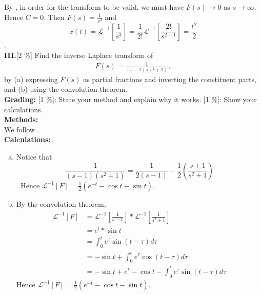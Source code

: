 \documentclass[A4paper,12pt]{article}
\theoremstyle{definition}
\numberwithin{equation}{section}
\begin{document}
By \cite{textbook}, in order for the transform to be valid, we must have $F(s) \rightarrow 0$ as $s \rightarrow \infty$. Hence $C= 0$.
Then $F(s) = \frac{1}{s^3}$ and
$$
x(t) = \mathcal{L}^{-1}[\frac{1}{s^3}] = \frac{1}{2!} \mathcal{L}^{-1}[\frac{2!}{s^{2+1}}] = \frac{t^2}{2}
$$.
\\
\textbf{III.}[2 \%]
Find the inverse Laplace transform of
\begin{align*}
F(s)=\frac{1}{(s-1)(s^2+1)},
\end{align*}
by (a) expressing \(F(s)\) as partial fractions and inverting the
constituent parts, and (b) using the convolution theorem.\\
\textbf{Grading:}
[1 \%]: State your method and explain why it works.
[1 \%]: Show your calculations.\\
\textbf{Methods: }\\
We follow \cite{textbook}.
\\
\textbf{Calculations: }\\
\begin{enumerate}[(a)]
    \item
        Notice that $$\frac{1}{(s-1)(s^2+1)} = \frac{1}{2(s-1)} - \frac{1}{2}(\frac{s+1}{s^2+1})$$.
        Hence $\mathcal{L}^{-1}[F] = \frac{1}{2}(e^{-t}-\cos t - \sin t)$.
    \item
        By the convolution theorem,
        \begin{align*}
            \mathcal{L}^{-1}[F] &= \mathcal{L}^{-1}[\frac{1}{s-1}] * \mathcal{L}^{-1} [\frac{1}{s^2+1}] \\
                                &= e^t * \sin t \\
                                &= \int_0^t e^\tau \sin (t-\tau) d\tau \\
                                &= -\sin t + \int_0^t e^\tau \cos(t-\tau)d\tau \\
                                &= -\sin t + e^t - \cos t - \int_0^t e^\tau \sin (t-\tau) d\tau 
        \end{align*}
        Hence $\mathcal{L}^{-1}[F] = \frac{1}{2}(e^{-t}-\cos t - \sin t)$.
\end{enumerate}



\end{document}
